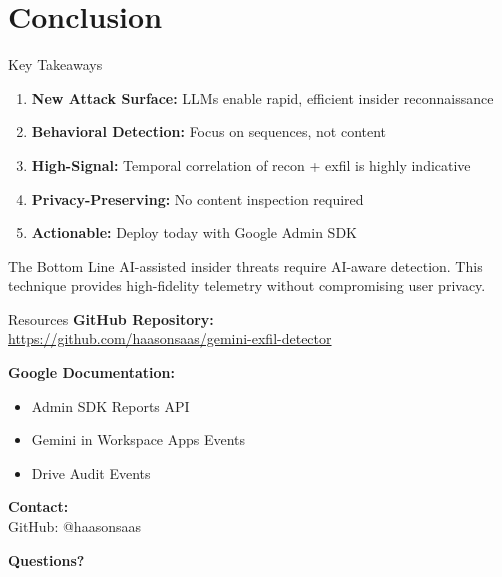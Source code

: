 \documentclass[aspectratio=169]{beamer}
\begin{document}
\section{Conclusion}

\begin{frame}{Key Takeaways}
\begin{enumerate}
    \item \textbf{New Attack Surface:} LLMs enable rapid, efficient insider reconnaissance
    \item \textbf{Behavioral Detection:} Focus on sequences, not content
    \item \textbf{High-Signal:} Temporal correlation of recon + exfil is highly indicative
    \item \textbf{Privacy-Preserving:} No content inspection required
    \item \textbf{Actionable:} Deploy today with Google Admin SDK
\end{enumerate}

\vspace{1em}

\begin{block}{The Bottom Line}
AI-assisted insider threats require AI-aware detection. This technique provides high-fidelity telemetry without compromising user privacy.
\end{block}
\end{frame}

\begin{frame}{Resources}
\textbf{GitHub Repository:} \\
\url{https://github.com/haasonsaas/gemini-exfil-detector}

\vspace{1em}

\textbf{Google Documentation:}
\begin{itemize}
    \item Admin SDK Reports API
    \item Gemini in Workspace Apps Events
    \item Drive Audit Events
\end{itemize}

\vspace{1em}

\textbf{Contact:} \\
GitHub: @haasonsaas

\vspace{1em}

\centering
\Large
\textbf{Questions?}
\end{frame}
\end{document}
